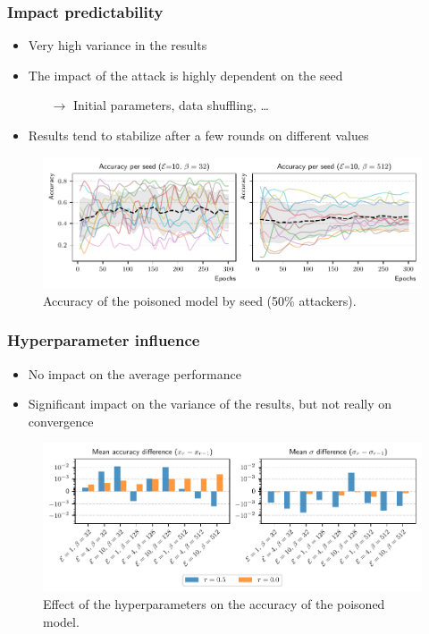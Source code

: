 \documentclass[color,t,presentation,english,aspectratio=169]{beamer}
\begin{document}
\begin{frame}
	\frametitle{Impact predictability}
	\begin{itemize}
		\item Very high variance in the results
		\item The impact of the attack is highly dependent on the seed
		\begin{itemize}
			\item[$\rightarrow$] Initial parameters, data shuffling, \dots
		\end{itemize}
		\item Results tend to stabilize after a few rounds on different values
	\end{itemize}
	
	\vspace{\baselineskip}

	\begin{figure}
		\centering
		\includegraphics[width=.8\textwidth]{figures/predictability-all.pdf}
		\vspace{-2ex}
		\caption{Accuracy of the poisoned model by seed (50\% attackers).}
	\end{figure}
	
\end{frame}

\begin{frame}
	\frametitle{Hyperparameter influence}

	\begin{itemize}
		\item No impact on the average performance
		\item Significant impact on the variance of the results, but not really on convergence
	\end{itemize}

	\vspace{\baselineskip}

	\begin{figure}
		\centering
		\includegraphics[width=.8\textwidth]{figures/hyperparams-continous-cicids-small.pdf}
		\vspace{-2ex}
		\caption{Effect of the hyperparameters on the accuracy of the poisoned model.}
	\end{figure}
\end{frame}
\end{document}
